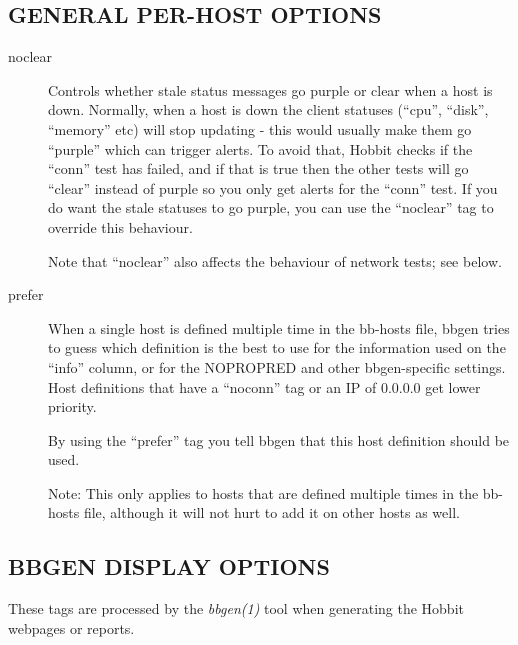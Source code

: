 \subsection{GENERAL PER-HOST OPTIONS }
\begin{description}
\item[noclear] Controls whether stale status messages go purple or
  clear when a host is down. Normally, when a host is down the client
  statuses (``cpu'', ``disk'', ``memory'' etc) will stop updating -
  this would usually make them go ``purple'' which can trigger
  alerts. To avoid that, Hobbit checks if the ``conn'' test has
  failed, and if that is true then the other tests will go ``clear''
  instead of purple so you only get alerts for the ``conn'' test. If
  you do want the stale statuses to go purple, you can use the
  ``noclear'' tag to override this behaviour. 


  Note that ``noclear'' also affects the behaviour of network tests; see below. 


 

\item[prefer] When a single host is defined multiple time in the
  bb-hosts file, bbgen tries to guess which definition is the best to
  use for the information used on the ``info'' column, or for the
  NOPROPRED and other bbgen-specific settings. Host definitions that
  have a ``noconn'' tag or an IP of 0.0.0.0 get lower priority. 


  By using the ``prefer'' tag you tell bbgen that this host definition should be used. 


  Note: This only applies to hosts that are defined multiple times in
  the bb-hosts file, although it will not hurt to add it on other
  hosts as well. 



 
\end{description}
\subsection{BBGEN DISPLAY OPTIONS}
 These tags are processed by the \emph{bbgen(1)}
 tool when generating the Hobbit webpages or reports. 

